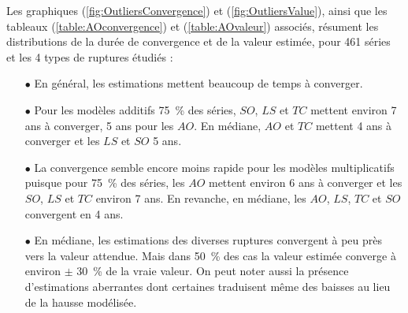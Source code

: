 \documentclass[12pt, a4paper, french]{article}
\begin{document}
\vspace{2mm}

Les graphiques (\ref{fig:OutliersConvergence}) et (\ref{fig:OutliersValue}), ainsi que les tableaux (\ref{table:AOconvergence}) et (\ref{table:AOvaleur}) associés, résument les distributions de la durée de convergence et de la valeur estimée, pour 461 séries et les 4 types de ruptures étudiés :
\begin{itemize}
	\item[$\bullet$] En général, les estimations mettent beaucoup de temps à converger.
		\item[$\bullet$] Pour les modèles additifs 75~\% des séries, $SO$, $LS$ et $TC$ mettent environ 7 ans à converger, 5 ans pour les $AO$. En médiane, $AO$ et $TC$ mettent 4 ans à converger et les $LS$ et $SO$ 5 ans.
	\item[$\bullet$] La convergence semble encore moins rapide pour les modèles multiplicatifs puisque pour 75~\% des séries, les $AO$ mettent environ 6 ans à converger et les $SO$, $LS$ et $TC$ environ 7 ans. En revanche, en médiane, les $AO$, $LS$, $TC$ et $SO$ convergent en 4 ans.
	\item[$\bullet$] En médiane, les estimations des diverses ruptures convergent à peu près vers la valeur attendue. Mais dans 50~\% des cas la valeur estimée converge à environ $\pm$ 30~\% de la vraie valeur. On peut noter aussi la présence d'estimations aberrantes dont certaines traduisent même des baisses au lieu de la hausse modélisée.

\end{itemize}
\end{document}
